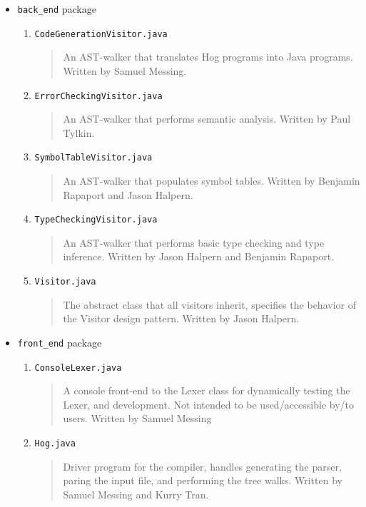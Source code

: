 \documentclass{report}
\begin{document}
\begin{itemize}
\item \texttt{back\_end} package
\begin{enumerate}
\item \texttt{CodeGenerationVisitor.java}
\begin{quotation}
\noindent An AST-walker that translates Hog programs into Java programs. Written by Samuel Messing.
\end{quotation}
\item \texttt{ErrorCheckingVisitor.java}
\begin{quotation}
\noindent An AST-walker that performs semantic analysis. Written by Paul Tylkin.
\end{quotation}
\item \texttt{SymbolTableVisitor.java}
\begin{quotation}
\noindent An AST-walker that populates symbol tables. Written by Benjamin Rapaport and Jason Halpern.
\end{quotation}
\item \texttt{TypeCheckingVisitor.java}
\begin{quotation}
\noindent An AST-walker that performs basic type checking and type inference. Written by Jason Halpern and Benjamin Rapaport. 
\end{quotation}
\item \texttt{Visitor.java}
\begin{quotation}
\noindent The abstract class that all visitors inherit, specifies the behavior of the Visitor design pattern. Written by Jason Halpern.
\end{quotation}
\end{enumerate} %
\item \texttt{front\_end} package
\begin{enumerate}
\item \texttt{ConsoleLexer.java}
\begin{quotation}
\noindent A console front-end to the Lexer class for dynamically testing the Lexer,
 and development. Not intended to be used/accessible by/to users. Written by Samuel Messing
\end{quotation}
\item \texttt{Hog.java}
\begin{quotation}
\noindent Driver program for the compiler, handles generating the parser, paring the input file, and performing the tree walks. Written by Samuel Messing and Kurry Tran. 
\end{quotation}

\end{enumerate}
\end{itemize}
\end{document}
